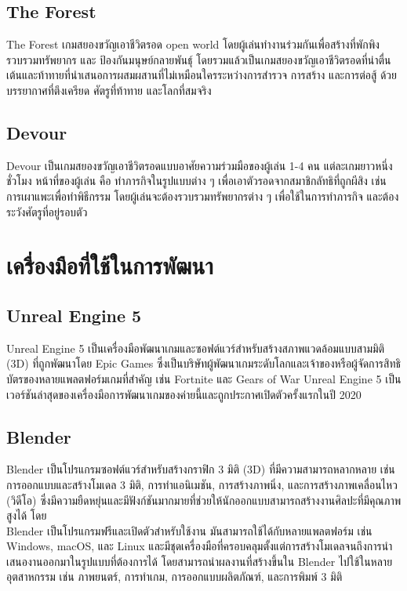 \subsection{The Forest}

The Forest เกมสยองขวัญเอาชีวิตรอด open world โดยผู้เล่นทำงานร่วมกันเพื่อสร้างที่พักพิง รวบรวมทรัพยากร และ ป้องกันมนุษย์กลายพันธุ์ โดยรวมแล้วเป็นเกมสยองขวัญเอาชีวิตรอดที่น่าตื่นเต้นและท้าทายที่นำเสนอการผสมผสานที่ไม่เหมือนใครระหว่างการสำรวจ การสร้าง และการต่อสู้ ด้วยบรรยากาศที่ตึงเครียด ศัตรูที่ท้าทาย และโลกที่สมจริง \cite{TheForest}



\subsection{Devour}

Devour เป็นเกมสยองขวัญเอาชีวิตรอดแบบอาศัยความร่วมมือของผู้เล่น 1-4 คน แต่ละเกมยาวหนึ่งชั่วโมง หน้าที่ของผู้เล่น คือ ทำภารกิจในรูปแบบต่าง ๆ เพื่อเอาตัวรอดจากสมาชิกลัทธิที่ถูกผีสิง เช่น การเผาแพะเพื่อทำพิธีกรรม โดยผู้เล่นจะต้องรวบรวมทรัพยากรต่าง ๆ เพื่อใช้ในการทำภารกิจ และต้องระวังศัตรูที่อยู่รอบตัว \cite{Devour}

\section{เครื่องมือที่ใช้ในการพัฒนา}
\subsection{ Unreal Engine 5}
Unreal Engine 5 เป็นเครื่องมือพัฒนาเกมและซอฟต์แวร์สำหรับสร้างสภาพแวดล้อมแบบสามมิติ (3D) ที่ถูกพัฒนาโดย Epic Games ซึ่งเป็นบริษัทผู้พัฒนาเกมระดับโลกและเจ้าของหรือผู้จัดการสิทธิบัตรของหลายแพลตฟอร์มเกมที่สำคัญ เช่น Fortnite และ Gears of War Unreal Engine 5 เป็นเวอร์ชันล่าสุดของเครื่องมือการพัฒนาเกมของค่ายนี้และถูกประกาศเปิดตัวครั้งแรกในปี 2020

\subsection{Blender}
Blender เป็นโปรแกรมซอฟต์แวร์สำหรับสร้างกราฟิก 3 มิติ (3D) ที่มีความสามารถหลากหลาย เช่น การออกแบบและสร้างโมเดล 3 มิติ, การทำแอนิเมชัน, การสร้างภาพนิ่ง, และการสร้างภาพเคลื่อนไหว (วิดีโอ) ซึ่งมีความยืดหยุ่นและมีฟังก์ชันมากมายที่ช่วยให้นักออกแบบสามารถสร้างงานศิลปะที่มีคุณภาพสูงได้ โดย \\Blender เป็นโปรแกรมฟรีและเปิดตัวสำหรับใช้งาน มันสามารถใช้ได้กับหลายแพลตฟอร์ม เช่น Windows, macOS, และ Linux และมีชุดเครื่องมือที่ครอบคลุมตั้งแต่การสร้างโมเดลจนถึงการนำเสนองานออกมาในรูปแบบที่ต้องการได้ โดยสามารถนำผลงานที่สร้างขึ้นใน Blender ไปใช้ในหลายอุตสาหกรรม เช่น ภาพยนตร์, การทำเกม, การออกแบบผลิตภัณฑ์, และการพิมพ์ 3 มิติ

